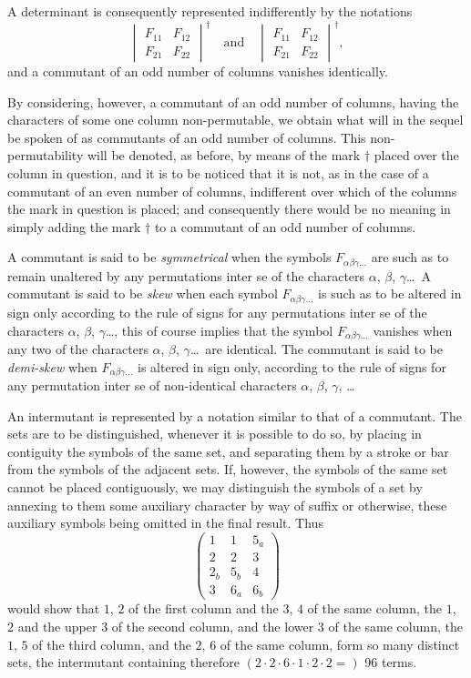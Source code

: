 \documentclass[11pt,a4paper]{book}
\begin{document}
A determinant is consequently represented indifferently by the notations
\[\begin{vmatrix} F_{11} & F_{12} \\ F_{21} & F_{22} \end{vmatrix}^{\dagger} \quad \text{and} \quad \begin{vmatrix} F_{11} & F_{12} \\ F_{21} & F_{22} \end{vmatrix}^{\dagger},\]
and a commutant of an odd number of columns vanishes identically.

By considering, however, a commutant of an odd number of columns, having the characters of some one column non-permutable, we obtain what will in the sequel be spoken of as commutants of an odd number of columns. This non-permutability will be denoted, as before, by means of the mark $\dagger$ placed over the column in question, and it is to be noticed that it is not, as in the case of a commutant of an even number of columns, indifferent over which of the columns the mark in question is placed; and consequently there would be no meaning in simply adding the mark $\dagger$ to a commutant of an odd number of columns.

A commutant is said to be \textit{symmetrical} when the symbols $F_{\alpha\beta\gamma\ldots}$ are such as to remain unaltered by any permutations inter se of the characters $\alpha$, $\beta$, $\gamma$\ldots\ A commutant is said to be \textit{skew} when each symbol $F_{\alpha\beta\gamma\ldots}$ is such as to be altered in sign only according to the rule of signs for any permutations inter se of the characters $\alpha$, $\beta$, $\gamma$\ldots, this of course implies that the symbol $F_{\alpha\beta\gamma\ldots}$ vanishes when any two of the characters $\alpha$, $\beta$, $\gamma$\ldots\ are identical. The commutant is said to be \textit{demi-skew} when $F_{\alpha\beta\gamma\ldots}$ is altered in sign only, according to the rule of signs for any permutation inter se of non-identical characters $\alpha$, $\beta$, $\gamma$, \ldots

An intermutant is represented by a notation similar to that of a commutant. The sets are to be distinguished, whenever it is possible to do so, by placing in contiguity the symbols of the same set, and separating them by a stroke or bar from the symbols of the adjacent sets. If, however, the symbols of the same set cannot be placed contiguously, we may distinguish the symbols of a set by annexing to them some auxiliary character by way of suffix or otherwise, these auxiliary symbols being omitted in the final result. Thus
\[\begin{pmatrix} 1 & 1 & 5_a \\ 2 & 2 & 3 \\ \hline 2_b & 5_b & 4 \\ 3 & 6_a & 6_b \end{pmatrix}\]
would show that $1$, $2$ of the first column and the $3$, $4$ of the same column, the $1$, $2$ and the upper $3$ of the second column, and the lower $3$ of the same column, the $1$, $5$ of the third column, and the $2$, $6$ of the same column, form so many distinct sets, the intermutant containing therefore $(2 \cdot 2 \cdot 6 \cdot 1 \cdot 2 \cdot 2 = )$ 96 terms.
\end{document}
